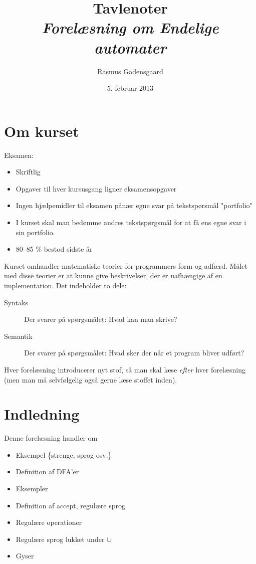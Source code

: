\documentclass[a4paper,10pt,article]{memoir}
\title{Tavlenoter \\ \emph{Forelæsning om Endelige automater}}
\author{Rasmus Gadensgaard}
\date{5. februar 2013}
\begin{document}
\maketitle

\tableofcontents*

\chapter{Om kurset}

Eksamen:
\begin{itemize}
	\item Skriftlig
	\item Opgaver til hver kursusgang ligner eksamensopgaver
	\item Ingen hjælpemidler til eksamen pånær egne svar på tekstspørsmål "portfolio"
	\item I kurset skal man bedømme andres tekstspørgsmål for at få ens egne svar i sin portfolio.
	\item 80--85 \% bestod sidste år
\end{itemize}

Kurset omhandler matematiske teorier for programmers form og
adfærd. Målet med disse teorier er at kunne give beskrivelser, der er
uafhængige af en implementation. Det indeholder to dele:

\begin{description}
	\item[Syntaks] Der svarer på spørgsmålet: Hvad kan man skrive?
	\item[Semantik] Der svarer på spørgsmålet: Hvad sker der når et program bliver udført? 
\end{description}

Hver forelæsning introducerer nyt stof, så man skal læse \emph{efter}
hver forelæsning (men man må selvfølgelig også gerne læse stoffet inden).

\chapter{Indledning}

Denne forelæsning handler om

\begin{itemize}
\item Eksempel \{strenge, sprog osv.\}
\item Definition af DFA'er
\item Eksempler
\item Definition af accept, regulære sprog
\item Regulære operationer
\item Regulære sprog lukket under $\cup$ 
\item Gyser
\end{itemize}
\end{document}
